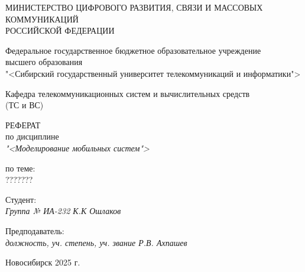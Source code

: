 \thispagestyle{empty}

\begin{center}
    МИНИСТЕРСТВО ЦИФРОВОГО РАЗВИТИЯ, СВЯЗИ И МАССОВЫХ КОММУНИКАЦИЙ \\ РОССИЙСКОЙ ФЕДЕРАЦИИ

    \vspace{20pt}

    Федеральное государственное бюджетное образовательное учреждение  \\  высшего образования \\
    "<Сибирский государственный университет телекоммуникаций и информатики"> \\

    \vspace{20pt}

    Кафедра телекоммуникационных систем и вычислительных средств \\  (ТС и ВС)
\end{center}

\vfill

\begin{center}
    РЕФЕРАТ \\  
    по дисциплине \\
    \textit{"<Моделирование мобильных систем">}

    \vspace{20pt}

    по теме: \\
    \uppercase{???????}
\end{center}

\vfill

    \noindent Студент: \\
    \textit{Группа № ИА-232 \hfill К.К Ошлаков}

    \vspace{20pt}

    \noindent Предподаватель: \\
    \textit{должность, уч. степень, уч. звание \hfill Р.В. Ахпашев}

\vfill

\begin{center}
    Новосибирск 2025 г.
\end{center}